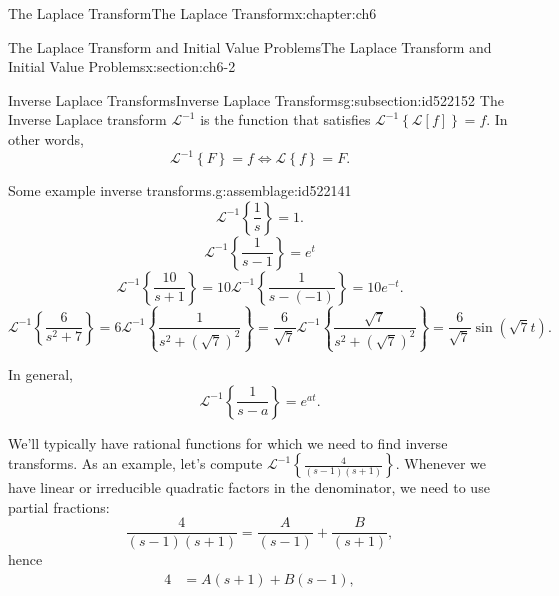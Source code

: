 \documentclass[oneside,10pt,]{book}
\numberwithin{equation}{section}
\numberwithin{equation}{section}
\newcommand{\amp}{&}
\begin{document}
\begin{chapterptx}{The Laplace Transform}{}{The Laplace Transform}{}{}{x:chapter:ch6}
\begin{sectionptx}{The Laplace Transform and Initial Value Problems}{}{The Laplace Transform and Initial Value Problems}{}{}{x:section:ch6-2}
\typeout{************************************************}
%
\begin{subsectionptx}{Inverse Laplace Transforms}{}{Inverse Laplace Transforms}{}{}{g:subsection:id522152}
The Inverse Laplace transform \(\mathcal{L}^{-1}\) is the function that satisfies \(\mathcal{L}^{-1}\left\{ \mathcal{L}\left[f\right]\right\} =f\). In other words,%
\begin{equation*}
\mathcal{L}^{-1}\left\{ F\right\} =f\iff\mathcal{L}\left\{ f\right\} =F.
\end{equation*}
%
\begin{assemblage}{Some example inverse transforms.}{g:assemblage:id522141}%
%
\begin{equation*}
\mathcal{L}^{-1}\left\{ \frac{1}{s}\right\} =1\text{.}
\end{equation*}
%
\begin{equation*}
\mathcal{L}^{-1}\left\{ \frac{1}{s-1}\right\} =e^{t}
\end{equation*}
%
\begin{equation*}
\mathcal{L}^{-1}\left\{ \frac{10}{s+1}\right\} =10\mathcal{L}^{-1}\left\{ \frac{1}{s-(-1)}\right\} =10e^{-t}\text{.}
\end{equation*}
%
\begin{equation*}
\mathcal{L}^{-1}\left\{ \frac{6}{s^{2}+7}\right\} =6\mathcal{L}^{-1}\left\{ \frac{1}{s^{2}+\left(\sqrt{7}\right)^{2}}\right\} =\frac{6}{\sqrt{7}}\mathcal{L}^{-1}\left\{ \frac{\sqrt{7}}{s^{2}+\left(\sqrt{7}\right)^{2}}\right\} =\frac{6}{\sqrt{7}}\sin\left(\sqrt{7}t\right)\text{.}
\end{equation*}
%
\end{assemblage}
In general,%
\begin{equation*}
\mathcal{L}^{-1}\left\{ \frac{1}{s-a}\right\} =e^{at}.
\end{equation*}
%
\par
We'll typically have rational functions for which we need to find inverse transforms. As an example, let's compute \(\mathcal{L}^{-1}\left\{ \frac{4}{\left(s-1\right)\left(s+1\right)}\right\} \). Whenever we have linear or irreducible quadratic factors in the denominator, we need to use partial fractions:%
\begin{equation*}
\frac{4}{\left(s-1\right)\left(s+1\right)}=\frac{A}{\left(s-1\right)}+\frac{B}{\left(s+1\right)},
\end{equation*}
hence%
\begin{align*}
4 \amp =A\left(s+1\right)+B\left(s-1\right),\\

\end{align*}
\end{subsectionptx}
\end{sectionptx}
\end{chapterptx}
\end{document}
